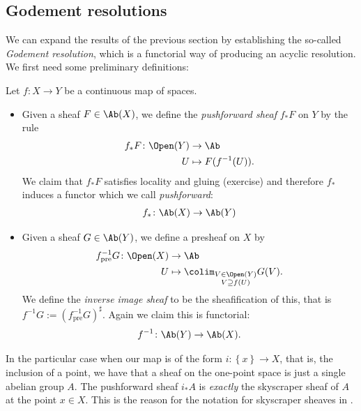 \documentclass[11pt]{book}
\begin{document}
\subsection{Godement resolutions}

We can expand the results of the previous section by establishing the so-called \emph{Godement resolution}, which is a functorial way of producing an acyclic resolution. We first need some preliminary definitions:

\begin{definition}\label{def:pullback-pushforward} Let $f \colon X \to Y$ be a continuous map of spaces.
\begin{itemize}
    \item Given a sheaf $F\in \Ab(X)$, we define the \emph{pushforward sheaf} $f_\ast F$ on $Y$ by the rule
    \begin{align*}
        f_\ast F \colon \Open(Y) &\to \Ab \\
        U &\mapsto F(f^{-1}(U)).
    \end{align*}
    We claim that $f_\ast F$ satisfies locality and gluing (exercise) and therefore $f_\ast$ induces a functor which we call \emph{pushforward}:
    \begin{align*}
        f_\ast \colon \Ab(X) \to \Ab(Y)
    \end{align*}
    \item Given a sheaf $G\in \Ab(Y)$, we define a presheaf on $X$ by
    \begin{align*}
        f^{-1}_\text{pre}G \colon \Open(X) &\to \Ab \\
        U &\mapsto \colim_{\substack{V\in \Open(Y) \\ V \supseteq f(U)}} G(V).
    \end{align*}
    We define the \emph{inverse image sheaf} to be the sheafification of this, that is $f^{-1}G := (f^{-1}_\text{pre}G)^\sharp$. Again we claim this is functorial:
    \begin{align*}
        f^{-1} \colon \Ab(Y) \to \Ab(X).
    \end{align*}
\end{itemize}
\end{definition}

\begin{example} In the particular case when our map is of the form $i \colon \left\{ x \right\} \to X$, that is, the inclusion of a point, we have that a sheaf on the one-point space is just a single abelian group $A$. The pushforward sheaf $i_\ast A$ is \emph{exactly} the skyscraper sheaf of $A$ at the point $x \in X$. This is the reason for the notation for skyscraper sheaves in .
\end{example}
\end{document}

